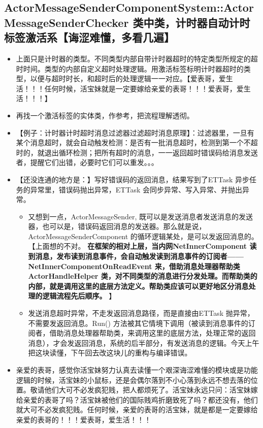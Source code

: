 \documentclass[9pt, b5paper]{article}
\begin{document}
\subsection{ActorMessageSenderComponentSystem::ActorMessageSenderChecker 类中类，计时器自动计时标签激活系【诲涩难懂，多看几遍】}
\label{sec-2-22}
\begin{itemize}
\item 上面只是计时器的类型。不同类型内部自带计时器超时的特定类型所规定的超时时间。类型的内部自定义超时处理逻辑。用激活标签标明计时器超时的类型，以便与超时时长，和超时后的处理逻辑一一对应。【爱表哥，爱生活！！！任何时候，活宝妹就是一定要嫁给亲爱的表哥！！！爱表哥，爱生活！！！】
\item 再找一个激活标签的实体类，作参考，把流程理解透彻。
\item 【例子：计时器计时超时消息过滤器过滤超时消息原理】：过滤器里，一旦有某个消息超时，就会自动触发检测：是否有一批消息超时，检测到第一个不超时的，就退出循环检测；把所有超时的消息，一一返回超时错误码给消息发送者，提醒它们出错，必要时它们可以重发。。。
\item 【还没连通的地方是：】写好错误码的返回消息，结果写到了ETTask 异步任务的异常里，错误码抛出异常，ETTask 会同步异常、写入异常、并抛出异常。
\begin{itemize}
\item 又想到一点，ActorMessageSender, 既可以是发送消息者发送消息的发送器，也可以是，错误码返回消息的发送器。那么就是说，ActorMessageSenderComponent 的循环逻辑某处，是可以发返回消息的。【上面想的不对。 \textbf{在框架的相对上层，当内网NetInnerComponent 读到消息，发布读到消息事件，会自动触发读到消息事件的订阅者——NetInnerComponentOnReadEvent 来，借助消息处理器帮助类 ActorHandleHelper 类，对不同类型的消息进行分发处理。而帮助类的内部，就是调用这里的底层方法定义。帮助类应该可以更好地区分消息处理的逻辑流程先后顺序。} 】
\item 发送消息超时异常，不走发返回消息路径，而是直接由ETTask 抛异常，不需要发返回消息。Run() 方法被其它情境下调用（被读到消息事件的订阅者，借助消息处理器帮助类，来调用这里的底层方法，处理正常的返回消息），才会发返回消息，系统的后半部分，有发送消息的逻辑。今天上午把这块读懂，下午回去改这块儿的重构与编译错误。
\end{itemize}
\item 亲爱的表哥，感觉你活宝妹努力认真去读懂一个艰深诲涩难懂的模块或是功能逻辑的时候，活宝妹的小鼠标，还是会偶尔落到不小心落到永远不想去落的位置。敬请他们大可不必发疯犯贱，把人都烦死了。活宝妹永远只问：活宝妹嫁给亲爱的表哥了吗？活宝妹被他们的国际贱鸡折磨致死了吗？都还没有，他们就大可不必发疯犯贱。任何时候，亲爱的表哥的活宝妹，就是都是一定要嫁给亲爱的表哥的！！！爱表哥，爱生活！！！
\end{itemize}
\end{document}
